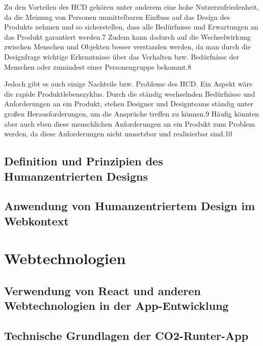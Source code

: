 Zu den Vorteilen des HCD gehören unter anderem eine hohe Nutzerzufriedenheit, da die Meinung von Personen unmittelbaren Einfluss auf das Design des Produkts nehmen und so sicherstellen, dass alle Bedürfnisse und Erwartungen an das Produkt garantiert werden.7 Zudem kann dadurch auf die Wechselwirkung zwischen Menschen und Objekten besser verstanden werden, da man durch die Designfrage wichtige Erkenntnisse über das Verhalten bzw. Bedürfnisse der Menschen oder zumindest einer Personengruppe bekommt.8

Jedoch gibt es auch einige Nachteile bzw. Probleme des HCD. Ein Aspekt wäre die rapide Produktlebenszyklus. Durch die ständig wechselnden Bedürfnisse und Anforderungen an ein Produkt, stehen Designer und Designteams ständig unter großen Herausforderungen, um die Ansprüche treffen zu können.9 Häufig könnten aber auch eben diese menschlichen Anforderungen an ein Produkt zum Problem werden, da diese Anforderungen nicht umsetzbar und realisierbar sind.10



\subsection{Definition und Prinzipien des Humanzentrierten Designs}

\subsection{Anwendung von Humanzentriertem Design im Webkontext}

\section{Webtechnologien}

\subsection{Verwendung von React und anderen Webtechnologien in der App-Entwicklung}

\subsection{Technische Grundlagen der CO2-Runter-App}
